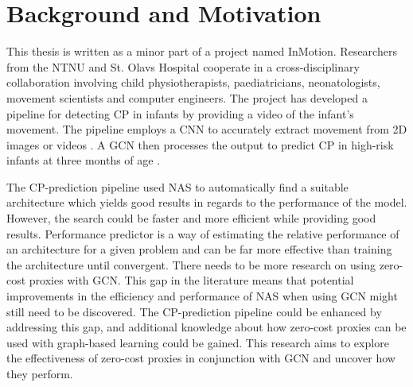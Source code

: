  \section{Background and Motivation}
This thesis is written as a minor part of a project named InMotion. Researchers from the \Gls{NTNU} and St. Olavs Hospital cooperate in a cross-disciplinary collaboration involving child physiotherapists, paediatricians, neonatologists, movement scientists and computer engineers. The project has developed a pipeline for detecting \Gls{CP} in infants by providing a video of the infant's movement. The pipeline employs a \Gls{CNN} to accurately extract movement from 2D images or videos \autocite{groos2021efficientpose}. A \gls{GCN} then processes the output to predict CP in high-risk infants at three months of age \autocite{groos2022convolutional}. 

The CP-prediction pipeline used \gls{NAS} to automatically find a suitable architecture which yields good results in regards to the performance of the model. However, the search could be faster and more efficient while providing good results. Performance predictor is a way of estimating the relative performance of an architecture for a given problem and can be far more effective than training the architecture until convergent. There needs to be more research on using zero-cost proxies with \gls{GCN}. This gap in the literature means that potential improvements in the efficiency and performance of \gls{NAS} when using \gls{GCN} might still need to be discovered. The CP-prediction pipeline could be enhanced by addressing this gap, and additional knowledge about how zero-cost proxies can be used with graph-based learning could be gained. This research aims to explore the effectiveness of zero-cost proxies in conjunction with \gls{GCN} and uncover how they perform. 